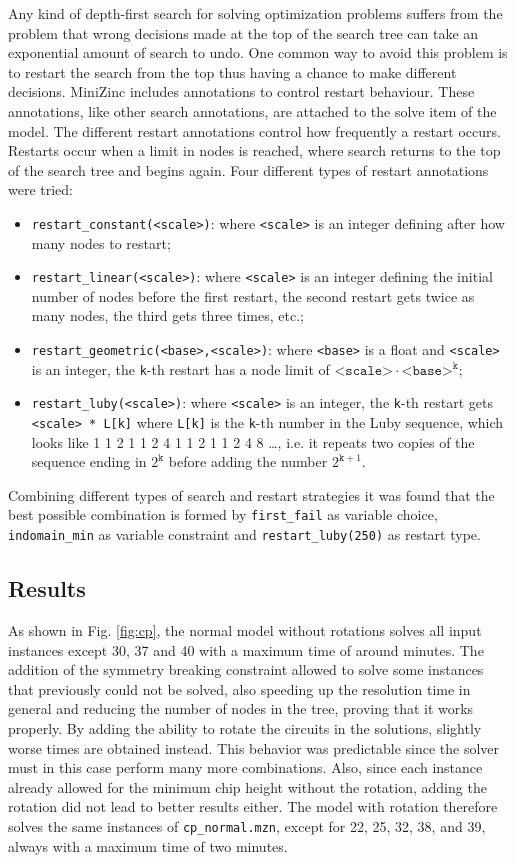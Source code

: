 \documentclass[a4paper, 12pt]{article}
\begin{document}
Any kind of depth-first search for solving optimization problems suffers from the problem that wrong decisions made at the top of the search tree can take an exponential amount of search to undo. One common way to avoid this problem is to restart the search from the top thus having a chance to make different decisions. MiniZinc includes annotations to control restart behaviour. These annotations, like other search annotations, are attached to the solve item of the model. The different restart annotations control how frequently a restart occurs. Restarts occur when a limit in nodes is reached, where search returns to the top of the search tree and begins again. Four different types of restart annotations were tried:
\begin{itemize}
	\item \verb|restart_constant(<scale>)|: where \verb|<scale>| is an integer defining after how many nodes to restart;
	\item \verb|restart_linear(<scale>)|: where \verb|<scale>| is an integer defining the initial number of nodes before the first restart, the second restart gets twice as many nodes, the third gets three times, etc.;
	\item \verb|restart_geometric(<base>,<scale>)|: where \verb|<base>| is a float and \verb|<scale>| is an integer, the \verb|k|-th restart has a node limit of $\texttt{<scale>} \cdot \texttt{<base>}^\texttt{k}$;
	\item \verb|restart_luby(<scale>)|: where \verb|<scale>| is an integer, the \verb|k|-th restart gets \verb|<scale> * L[k]| where \verb|L[k]| is the \verb|k|-th number in the Luby sequence, which looks like 1 1 2 1 1 2 4 1 1 2 1 1 2 4 8 …, i.e. it repeats two copies of the sequence ending in $2^\texttt{k}$ before adding the number $2^{\texttt{k}+1}$.
\end{itemize}
Combining different types of search and restart strategies it was found that the best possible combination is formed by \verb|first_fail| as variable choice, \verb|indomain_min| as variable constraint and \verb|restart_luby(250)| as restart type.

\subsection{Results}
As shown in Fig. \ref{fig:cp}, the normal model without rotations solves all input instances except 30, 37 and 40 with a maximum time of around minutes. The addition of the symmetry breaking constraint allowed to solve some instances that previously could not be solved, also speeding up the resolution time in general and reducing the number of nodes in the tree, proving that it works properly. By adding the ability to rotate the circuits in the solutions, slightly worse times are obtained instead. This behavior was predictable since the solver must in this case perform many more combinations. Also, since each instance already allowed for the minimum chip height without the rotation, adding the rotation did not lead to better results either. The model with rotation therefore solves the same instances of \verb|cp_normal.mzn|, except for 22, 25, 32, 38, and 39, always with a maximum time of two minutes.
\end{document}
